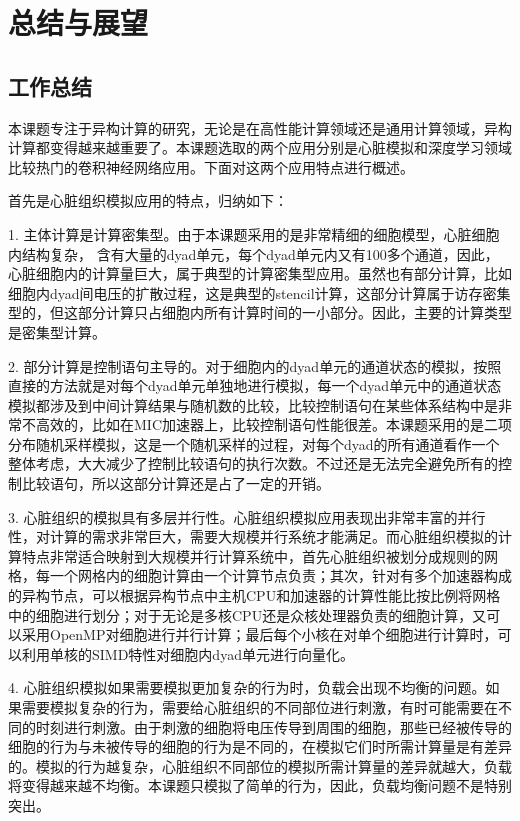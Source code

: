 \chapter{总结与展望}
\section{工作总结}
本课题专注于异构计算的研究，无论是在高性能计算领域还是通用计算领域，异构计算都变得越来越重要了。本课题选取的两个应用分别是心脏模拟和深度学习领域比较热门的卷积神经网络应用。下面对这两个应用特点进行概述。

首先是心脏组织模拟应用的特点，归纳如下：

\begin{compactitem}
\item[1.]
主体计算是计算密集型。由于本课题采用的是非常精细的细胞模型，心脏细胞内结构复杂， 含有大量的dyad单元，每个dyad单元内又有100多个通道，因此，心脏细胞内的计算量巨大，属于典型的计算密集型应用。虽然也有部分计算，比如细胞内dyad间电压的扩散过程，这是典型的stencil计算，这部分计算属于访存密集型的，但这部分计算只占细胞内所有计算时间的一小部分。因此，主要的计算类型是密集型计算。

\item[2.]
部分计算是控制语句主导的。对于细胞内的dyad单元的通道状态的模拟，按照直接的方法就是对每个dyad单元单独地进行模拟，每一个dyad单元中的通道状态模拟都涉及到中间计算结果与随机数的比较，比较控制语句在某些体系结构中是非常不高效的，比如在MIC加速器上，比较控制语句性能很差。本课题采用的是二项分布随机采样模拟，这是一个随机采样的过程，对每个dyad的所有通道看作一个整体考虑，大大减少了控制比较语句的执行次数。不过还是无法完全避免所有的控制比较语句，所以这部分计算还是占了一定的开销。

\item[3.]
心脏组织的模拟具有多层并行性。心脏组织模拟应用表现出非常丰富的并行性，对计算的需求非常巨大，需要大规模并行系统才能满足。而心脏组织模拟的计算特点非常适合映射到大规模并行计算系统中，首先心脏组织被划分成规则的网格，每一个网格内的细胞计算由一个计算节点负责；其次，针对有多个加速器构成的异构节点，可以根据异构节点中主机CPU和加速器的计算性能比按比例将网格中的细胞进行划分；对于无论是多核CPU还是众核处理器负责的细胞计算，又可以采用OpenMP对细胞进行并行计算；最后每个小核在对单个细胞进行计算时，可以利用单核的SIMD特性对细胞内dyad单元进行向量化。

\item[4.]
心脏组织模拟如果需要模拟更加复杂的行为时，负载会出现不均衡的问题。如果需要模拟复杂的行为，需要给心脏组织的不同部位进行刺激，有时可能需要在不同的时刻进行刺激。由于刺激的细胞将电压传导到周围的细胞，那些已经被传导的细胞的行为与未被传导的细胞的行为是不同的，在模拟它们时所需计算量是有差异的。模拟的行为越复杂，心脏组织不同部位的模拟所需计算量的差异就越大，负载将变得越来越不均衡。本课题只模拟了简单的行为，因此，负载均衡问题不是特别突出。


\end{compactitem}
